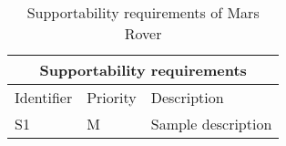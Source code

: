 \begin{table}[H]
	\centering
	\begin{tabular}{|l|l|l|}
		\hline
		\multicolumn{3}{|c|}{Supportability requirements} \\  \hline
		\hline
		Identifier & Priority & Description \\  
		\hline
		\hline
		S1 & M & Sample description \\  
		\hline
	\end{tabular}
\caption{Supportability requirements of Mars Rover}
\label{tbl:supportabilityReq}
\end{table}